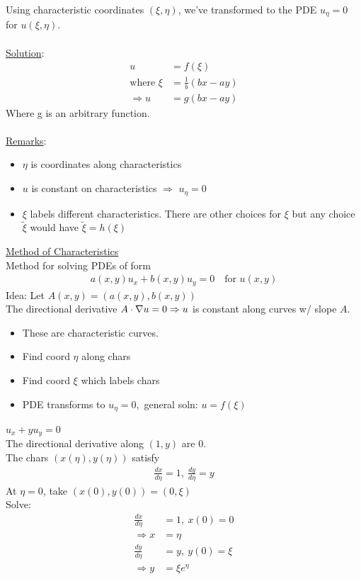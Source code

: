\documentclass[12pt, letterpaper]{article}
\begin{document}
Using characteristic coordinates $(\xi,\eta)$, we've transformed to the PDE 
$u_\eta = 0$ for $u(\xi,\eta)$. \\ \\
\underline{Solution}: 
\begin{align*}
    u &= f(\xi) \\
    \text{where } \xi &= \frac 1b (bx - ay) \\
    \Rightarrow u &= g(bx - ay)
\end{align*}
Where g is an arbitrary function. \\ \\
\underline{Remarks}: 
\begin{itemize}
    \item $\eta$ is coordinates along characteristics
    \item $u$ is constant on characteristics $\Rightarrow$ $u_\eta = 0$
    \item $\xi$ labels different characteristics. There are other choices for $\xi$
    but any choice $\tilde \xi$ would have $\tilde \xi = h(\xi)$
\end{itemize}
\underline{Method of Characteristics} \\
Method for solving PDEs of form 
\begin{align*}
    a(x,y) u_x + b(x,y) u_y = 0 \quad \text{for } u(x,y)
\end{align*}
Idea: Let $A(x,y) = (a(x,y),b(x,y))$ \\
The directional derivative $A \cdot \nabla u = 0  \\
\Rightarrow u$ is constant along curves w/ slope $A$.
\begin{itemize}
    \item These are characteristic curves.
    \item Find coord $\eta$ along chars
    \item Find coord $\xi$ which labels chars
    \item PDE transforms to $u_\eta = 0, $ general soln: $u = f(\xi)$
\end{itemize}
 $u_x + yu_y = 0$ \\
The directional derivative along $(1,y)$ are 0. \\
The chars $(x(\eta), y(\eta))$ satisfy 
\begin{align*}
    \frac{dx}{d\eta} = 1,\ \frac{dy}{d\eta} = y
\end{align*}
At $\eta = 0$, take $(x(0), y(0)) = (0,\xi)$ \\
Solve: 
\begin{align*}
    \frac{dx}{d\eta} &= 1,\ x(0) = 0 \\
    \Rightarrow x &= \eta \\
    \frac{dy}{d\eta} &= y,\ y(0) = \xi \\
    \Rightarrow y &= \xi e^\eta 
\end{align*}
\end{document}
